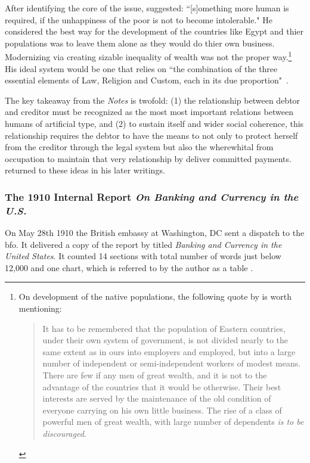 After identifying the core of the issue, \citeauthor{innes1909} suggested: ``[s]omething more human is required, if the unhappiness of the poor is not to become intolerable." \citep[p.~13]{innes1909} He considered the best way for the development of the countries like Egypt and thier populations was to leave them alone as they would do thier own business. Modernizing via creating sizable inequality of wealth was not the proper way.\footnote{On development of the native populations, the following quote by \citeauthor{innes1909} is worth mentioning: \begin{quote}It has to be remembered that the population of Eastern countries, under their own system of government, is not divided nearly to the same extent as in ours into employers and employed, but into a large number of independent or semi-independent workers of modest means. There are few if any men of great wealth, and it is not to the advantage of the countries that it would be otherwise. Their best interests are served by the maintenance of the old condition of everyone carrying on his own little business. The rise of a class of powerful men of great wealth, with large number of dependents \textit{is to be discouraged}.~\citep[p.~14, emphasis added]{innes1909}\end{quote}} His ideal system would be one that relies on ``the combination of the three essential elements of Law, Religion and Custom, each in its due proportion"~\citep[p.~45]{innes1909}.

The key takeaway from the \textit{Notes} is twofold: (1) the relationship between debtor and creditor must be recognized as the most most important relations between humans of artificial type, and (2) to sustain itself and wider social coherence, this relationship requires the debtor to have the means to not only to protect herself from the creditor through the legal system but also the wherewhital from occupation to maintain that very relationship by deliver committed payments. \citeauthor{innes1909} returned to these ideas in his later writings. 

\subsubsection{The 1910 Internal Report \textit{On Banking and Currency in the U.S.}}\label{sec:innes1910}

On May 28th 1910 the British embassy at Washington, DC sent a dispatch to the \ac{bfo}. It delivered a copy of the report by \citeauthor{innes1913} titled \textit{Banking and Currency in the United States}. It counted 14 sections with total number of words just below 12,000 and one chart, which is referred to by the author as a table \citep[p.~42]{innes1910}.

